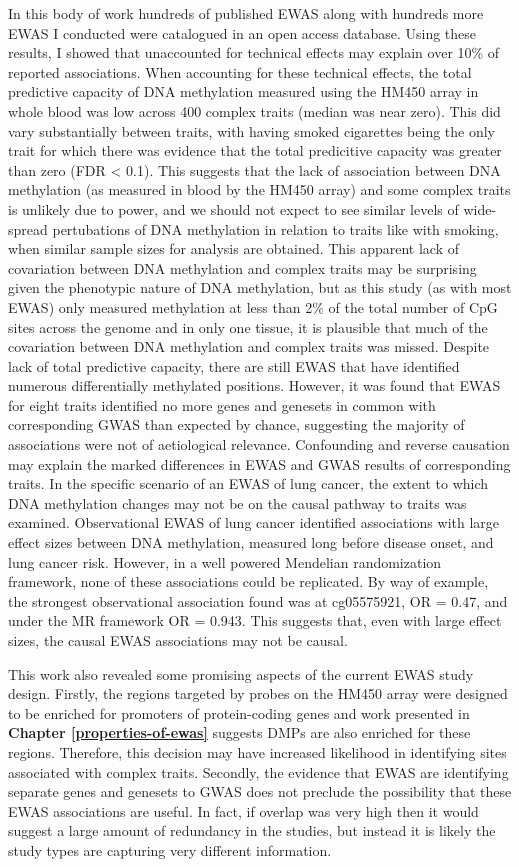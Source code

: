 \documentclass[11pt,oneside]{bristolthesis}
\begin{document}
In this body of work hundreds of published EWAS along with hundreds more EWAS I conducted were catalogued in an open access database. Using these results, I showed that unaccounted for technical effects may explain over 10\% of reported associations. When accounting for these technical effects, the total predictive capacity of DNA methylation measured using the HM450 array in whole blood was low across 400 complex traits (median was near zero). This did vary substantially between traits, with having smoked cigarettes being the only trait for which there was evidence that the total predicitive capacity was greater than zero (FDR \textless{} 0.1). This suggests that the lack of association between DNA methylation (as measured in blood by the HM450 array) and some complex traits is unlikely due to power, and we should not expect to see similar levels of wide-spread pertubations of DNA methylation in relation to traits like with smoking, when similar sample sizes for analysis are obtained. This apparent lack of covariation between DNA methylation and complex traits may be surprising given the phenotypic nature of DNA methylation, but as this study (as with most EWAS) only measured methylation at less than 2\% of the total number of CpG sites across the genome and in only one tissue, it is plausible that much of the covariation between DNA methylation and complex traits was missed. Despite lack of total predictive capacity, there are still EWAS that have identified numerous differentially methylated positions. However, it was found that EWAS for eight traits identified no more genes and genesets in common with corresponding GWAS than expected by chance, suggesting the majority of associations were not of aetiological relevance. Confounding and reverse causation may explain the marked differences in EWAS and GWAS results of corresponding traits. In the specific scenario of an EWAS of lung cancer, the extent to which DNA methylation changes may not be on the causal pathway to traits was examined. Observational EWAS of lung cancer identified associations with large effect sizes between DNA methylation, measured long before disease onset, and lung cancer risk. However, in a well powered Mendelian randomization framework, none of these associations could be replicated. By way of example, the strongest observational association found was at cg05575921, OR = 0.47, and under the MR framework OR = 0.943. This suggests that, even with large effect sizes, the causal EWAS associations may not be causal.

This work also revealed some promising aspects of the current EWAS study design. Firstly, the regions targeted by probes on the HM450 array were designed to be enriched for promoters of protein-coding genes and work presented in \textbf{Chapter \ref{properties-of-ewas}} suggests DMPs are also enriched for these regions. Therefore, this decision may have increased likelihood in identifying sites associated with complex traits. Secondly, the evidence that EWAS are identifying separate genes and genesets to GWAS does not preclude the possibility that these EWAS associations are useful. In fact, if overlap was very high then it would suggest a large amount of redundancy in the studies, but instead it is likely the study types are capturing very different information.
\end{document}
